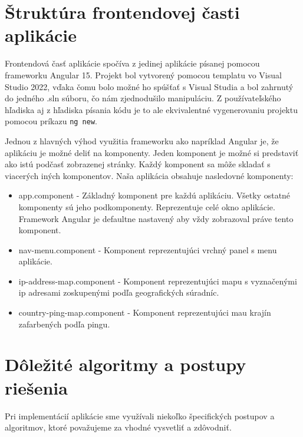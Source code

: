 \section{Štruktúra frontendovej časti aplikácie}
Frontendová časť aplikácie spočíva z jedinej aplikácie písanej pomocou frameworku Angular 15. Projekt bol vytvorený pomocou templatu vo Visual Studio 2022, vďaka čomu bolo možné ho 
spúšťať s Visual Studia a bol zahrnutý do jedného .sln súboru, čo nám zjednodušilo manipuláciu. Z používateľského hľadiska aj z hľadiska písania kódu je to ale ekvivalentné 
vygenerovaniu projektu pomocou príkazu \lstinline{ng new}.

Jednou z hlavných výhod využitia frameworku ako napríklad Angular je, že aplikáciu je možné deliť na komponenty. Jeden komponent je možné si predstaviť ako istú podčasť zobrazenej stránky. 
Každý komponent sa môže skladať s viacerých iných komponentov. Naša aplikácia obsahuje nasledovné komponenty:
\begin{itemize}
    \item app.component
    - Základný komponent pre každú aplikáciu. Všetky ostatné komponenty sú jeho podkomponenty. Reprezentuje celé okno aplikácie. Framework Angular je defaultne nastavený aby vždy 
    zobrazoval práve tento komponent. 
    \item nav-menu.component
    - Komponent reprezentujúci vrchný panel s menu aplikácie.
    \item ip-address-map.component
    - Komponent reprezentujúci mapu s vyznačenými ip adresami zoskupenými podľa geografických súradníc.
    \item country-ping-map.component 
    - Komponent reprezentujúci mau krajín zafarbených podľa pingu.
\end{itemize}

\section{Dôležité algoritmy a postupy riešenia}
\label{postupy}

Pri implementácií aplikácie sme využívali niekoľko špecifických postupov a algoritmov, ktoré považujeme za vhodné vysvetliť a zdôvodniť.